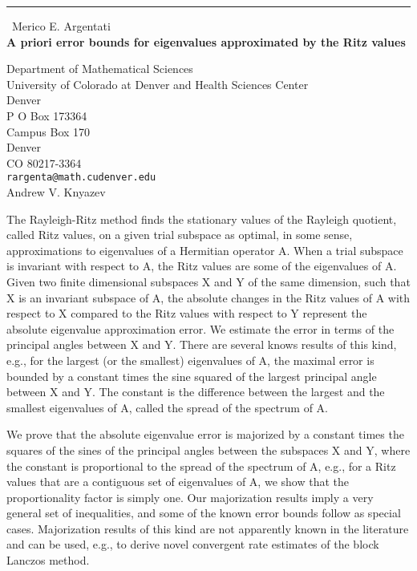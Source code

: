 \documentclass{report}
\begin{document}
\begin{center}
\rule{6in}{1pt} \
{\large Merico E. Argentati \\
{\bf A priori error bounds for eigenvalues approximated by the Ritz values}}

Department of Mathematical Sciences \\ University of Colorado at Denver and Health Sciences Center \\ Denver \\ P O Box 173364 \\ Campus Box 170 \\ Denver \\ CO 80217-3364
\\
{\tt rargenta@math.cudenver.edu}\\
Andrew V.  Knyazev\end{center}

The Rayleigh-Ritz method finds the stationary values of the Rayleigh
quotient, called Ritz values, on a given trial subspace as optimal, in
some sense, approximations to eigenvalues of a Hermitian operator A. When
a trial subspace is invariant with respect to A, the Ritz values are some
of the eigenvalues of A. Given two finite dimensional subspaces X and Y
of the same dimension, such that X is an invariant subspace of A, the
absolute changes in the Ritz values of A with respect to X compared to
the Ritz values with respect to Y represent the absolute eigenvalue
approximation error. We estimate the error in terms of the principal
angles between X and Y. There are several knows results of this kind,
e.g., for the largest (or the smallest) eigenvalues of A, the maximal
error is bounded by a constant times the sine squared of the largest
principal angle between X and Y. The constant is the difference between
the largest and the smallest eigenvalues of A, called the spread of the
spectrum of A.

We prove that the absolute eigenvalue error is majorized by a constant
times the squares of the sines of the principal angles between the
subspaces X and Y, where the constant is proportional to the spread of
the spectrum of A, e.g., for a Ritz values that are a contiguous set of
eigenvalues of A, we show that the proportionality factor is simply one.
Our majorization results imply a very general set of inequalities, and
some of the known error bounds follow as special cases. Majorization
results of this kind are not apparently known in the literature and can
be used, e.g., to derive novel convergent rate estimates of the block
Lanczos method.
\end{document}
